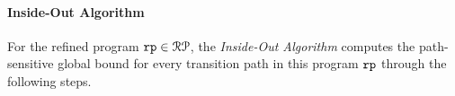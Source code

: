 %
\paragraph*{Inside-Out Algorithm}
For the refined program $\mathtt{rp} \in \mathcal{RP}$, the \emph{Inside-Out Algorithm}
computes the path-sensitive global bound for every transition path in this program $\mathtt{rp}$ through the following steps.


